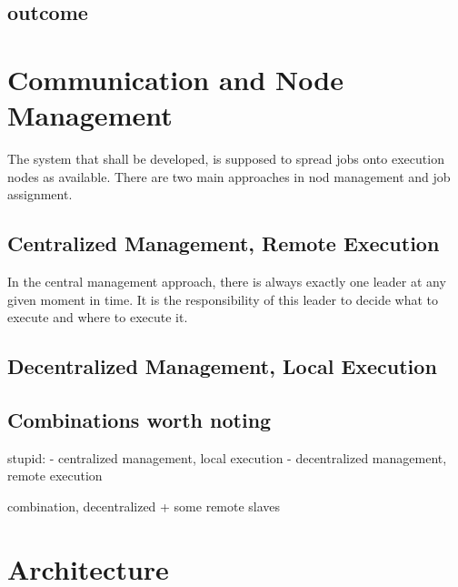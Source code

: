 \subsection{outcome}




\section{Communication and Node Management}

The system that shall be developed, is supposed to spread jobs onto execution nodes as available.
There are two main approaches in nod management and job assignment.



\subsection{Centralized Management, Remote Execution}

In the central management approach, there is always exactly one leader at any given moment in time.
It is the responsibility of this leader to decide what to execute and where to execute it.

\subsection{Decentralized Management, Local Execution}

\subsection{Combinations worth noting}

stupid:
 - centralized management, local execution
 - decentralized management, remote execution
 
combination, decentralized + some remote slaves

\section{Architecture}


